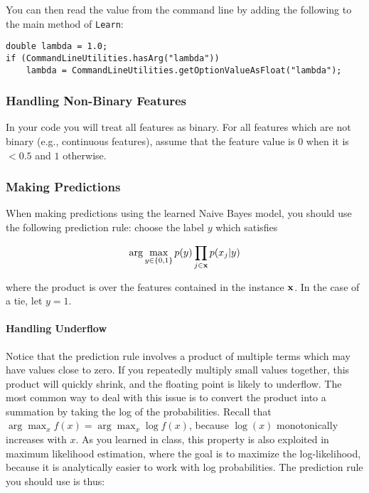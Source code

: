 \documentclass[11pt]{article}
\newcommand{\vx}{{\bf x}}
\newcommand{\code}[1]{{\footnotesize \tt #1}}
\begin{document}
You can then read the value from the command line by adding the following to the main method of \code{Learn}:
\begin{footnotesize}
\begin{verbatim}
double lambda = 1.0;
if (CommandLineUtilities.hasArg("lambda"))
    lambda = CommandLineUtilities.getOptionValueAsFloat("lambda");
\end{verbatim}
\end{footnotesize}

\subsubsection{Handling Non-Binary Features}

In your code you will treat all features as binary.
For all features which are not binary (e.g., continuous features),
assume that the feature value is $0$ when it is $<0.5$ and $1$ otherwise.


\subsubsection{Making Predictions}

When making predictions using the learned Naive Bayes model, you should use the following prediction rule: choose the label $y$ which satisfies

\begin{displaymath}
\arg\max_{y \in \{0,1\}} p(y) \prod_{j \in \vx} p(x_j | y)
\end{displaymath}

\noindent where the product is over the features contained in the instance $\vx$. In the case of a tie, let $y=1$.

\paragraph{Handling Underflow} Notice that the prediction rule involves a product of multiple terms which may have values close to zero. If you repeatedly multiply small values together, this product will quickly shrink, and the floating point is likely to underflow. The most common way to deal with this issue is to convert the product into a summation by taking the log of the probabilities. Recall that $\arg\max_{x} f(x) = \arg\max_{x} \log f(x)$, \noindent because $\log(x)$ monotonically increases with $x$. As you learned in class, this property is also exploited in maximum likelihood estimation, where the goal is to maximize the log-likelihood, because it is analytically easier to work with log probabilities. The prediction rule you should use is thus:
\end{document}
